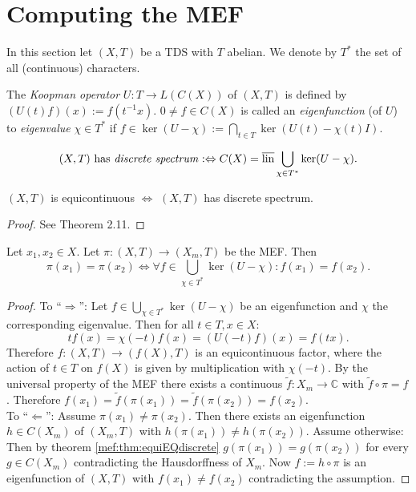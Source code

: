\section{Computing the MEF}
In this section let $(X,T)$ be a TDS with $T$ abelian.
We denote by $T^*$ the set of all (continuous) characters.
\begin{definition}
  The \emph{Koopman operator} $U : T \to L(C(X))$ of $(X,T)$ is defined by $(U(t) f)(x) := f(t^{-1}x)$.
  $0 \neq f \in C(X)$ is called an \emph{eigenfunction} (of $U$) to \emph{eigenvalue} $\chi \in T^*$ if $f \in \ker (U-\chi):= \bigcap_{t \in T} \ker (U(t)- \chi (t)I)$.
\end{definition}
\begin{definition}
  \begin{equation*}
    (X,T) \ \text{has \emph{discrete spectrum}}:\Leftrightarrow C(X) = \overline{\operatorname{lin}} \bigcup_{\chi \in T^*} \ker (U- \chi).
  \end{equation*}
\end{definition}
\begin{theorem}
  \label{mef:thm:equiEQdiscrete}
  $(X,T)$ is equicontinuous $\Leftrightarrow$ $(X,T)$ has discrete spectrum.
\end{theorem}
\begin{proof}
  See \cite{HK2023} Theorem 2.11.
\end{proof}

\begin{theorem}
  \label{thm:MEF_EFchar}
  Let $x_1,x_2 \in X$. Let $\pi : (X,T) \to (X_m,T)$ be the MEF.
  Then
  \begin{equation*}
  \pi (x_1) = \pi (x_2) \Leftrightarrow 
    \forall f \in \bigcup_{\chi \in T^*} \ker (U- \chi) : f(x_1) = f(x_2).
  \end{equation*}
\end{theorem}
\begin{proof}
  To \enquote{$\Rightarrow$}:
  Let $f \in \bigcup_{\chi \in T^*} \ker (U- \chi)$ be an eigenfunction and $\chi$ the corresponding eigenvalue.  Then for all $t \in T, x \in X$:
  \begin{equation*}
    t f(x) = \chi (-t) f (x) = (U(-t) f)(x) = f(tx).
  \end{equation*}
  Therefore $f: (X,T) \to (f(X),T)$ is an equicontinuous factor, where the action of $t \in T$ on $f(X)$ is given by multiplication with $\chi(-t)$.
  By the universal property of the MEF there exists a continuous $\tilde{f}  : X_m  \to \mathbb{C}$ with $\tilde{f} \circ \pi = f$.
  Therefore $f(x_1) = \tilde{f} (\pi (x_1) )=  \tilde{f} ( \pi (x_2)) = f (x_2)$.\\
  To \enquote{$\Leftarrow$}:
  Assume $\pi (x_1) \neq \pi (x_2)$.
  Then there exists an eigenfunction $h \in C(X_m)$ of $(X_m,T)$ with $h (\pi(x_1)) \neq h(\pi (x_2))$.
  Assume otherwise: Then by theorem \ref{mef:thm:equiEQdiscrete} $g (\pi (x_1)) = g(\pi (x_2))$ for every $g \in C(X_m)$ contradicting the Hausdorffness of $X_m$.
  Now $f:= h \circ \pi$ is an eigenfunction of $(X,T)$ with $f(x_1) \neq f(x_2)$ contradicting the assumption.
\end{proof}

